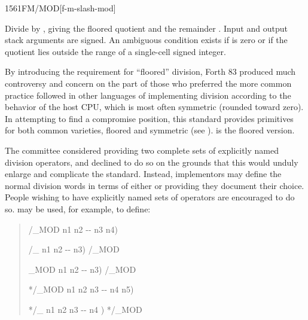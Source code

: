 \vspace*{-1ex}
\begin{worddef}{1561}{FM/MOD}[f-m-slash-mod]
\item {}

	Divide  by , giving the floored quotient
	 and the remainder . Input and output stack
	arguments are signed. An ambiguous condition exists if
	 is zero or if the quotient lies outside the range of
	a single-cell signed integer.


	\begin{rationale} %
		By introducing the requirement for ``floored'' division,
		Forth 83 produced much controversy and concern on the part of
		those who preferred the more common practice followed in other
		languages of implementing division according to the behavior
		of the host CPU, which is most often symmetric (rounded toward
		zero). In attempting to find a compromise position, this
		standard provides primitives for both common varieties, floored
		and symmetric (see ).  is the floored
		version.

		The committee considered providing two complete sets
		of explicitly named division operators, and declined to do so
		on the grounds that this would unduly enlarge and complicate
		the standard. Instead, implementors may define the normal
		division words in terms of either  or
		 providing they document their choice. People
		wishing to have explicitly named sets of operators are
		encouraged to do so.  may be used, for example,
		to define:

		\begin{quote}\ttfamily
			\word{:} /\_MOD  n1 n2 -{}- n3 n4)
				   
			\word{;}

			\word{:} /\_  n1 n2 -{}- n3)
				/\_MOD  
			\word{;}

			\word{:} \_MOD  n1 n2 -{}- n3)
				/\_MOD 
			\word{;}

			\word{:} */\_MOD  n1 n2 n3 -{}- n4 n5)
				   
			\word{;}

			\word{:} */\_  n1 n2 n3 -{}- n4 )
				*/\_MOD  
			\word{;}
		\end{quote}
	\end{rationale}


\end{worddef}
